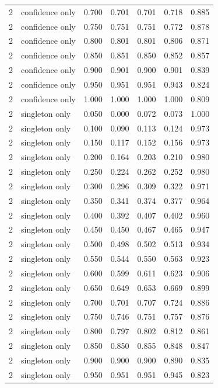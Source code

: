 \begin{tabular}{rlrrrrr}
2 & confidence only & 0.700 & 0.701 & 0.701 & 0.718 & 0.885 \\
2 & confidence only & 0.750 & 0.751 & 0.751 & 0.772 & 0.878 \\
2 & confidence only & 0.800 & 0.801 & 0.801 & 0.806 & 0.871 \\
2 & confidence only & 0.850 & 0.851 & 0.850 & 0.852 & 0.857 \\
2 & confidence only & 0.900 & 0.901 & 0.900 & 0.901 & 0.839 \\
2 & confidence only & 0.950 & 0.951 & 0.951 & 0.943 & 0.824 \\
2 & confidence only & 1.000 & 1.000 & 1.000 & 1.000 & 0.809 \\
2 & singleton only & 0.050 & 0.000 & 0.072 & 0.073 & 1.000 \\
2 & singleton only & 0.100 & 0.090 & 0.113 & 0.124 & 0.973 \\
2 & singleton only & 0.150 & 0.117 & 0.152 & 0.156 & 0.973 \\
2 & singleton only & 0.200 & 0.164 & 0.203 & 0.210 & 0.980 \\
2 & singleton only & 0.250 & 0.224 & 0.262 & 0.252 & 0.980 \\
2 & singleton only & 0.300 & 0.296 & 0.309 & 0.322 & 0.971 \\
2 & singleton only & 0.350 & 0.341 & 0.374 & 0.377 & 0.964 \\
2 & singleton only & 0.400 & 0.392 & 0.407 & 0.402 & 0.960 \\
2 & singleton only & 0.450 & 0.450 & 0.467 & 0.465 & 0.947 \\
2 & singleton only & 0.500 & 0.498 & 0.502 & 0.513 & 0.934 \\
2 & singleton only & 0.550 & 0.544 & 0.550 & 0.563 & 0.923 \\
2 & singleton only & 0.600 & 0.599 & 0.611 & 0.623 & 0.906 \\
2 & singleton only & 0.650 & 0.649 & 0.653 & 0.669 & 0.899 \\
2 & singleton only & 0.700 & 0.701 & 0.707 & 0.724 & 0.886 \\
2 & singleton only & 0.750 & 0.746 & 0.751 & 0.757 & 0.876 \\
2 & singleton only & 0.800 & 0.797 & 0.802 & 0.812 & 0.861 \\
2 & singleton only & 0.850 & 0.850 & 0.855 & 0.848 & 0.847 \\
2 & singleton only & 0.900 & 0.900 & 0.900 & 0.890 & 0.835 \\
2 & singleton only & 0.950 & 0.951 & 0.951 & 0.945 & 0.823 \\

\end{tabular}
